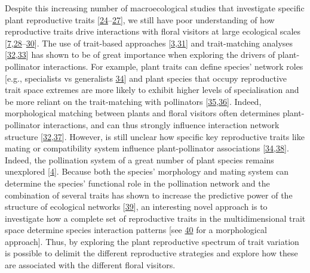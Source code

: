 \documentclass[
  12pt,
  a4paper,
]{article}
\begin{document}
Despite this increasing number of macroecological studies that investigate specific plant reproductive traits {[}\protect\hyperlink{ref-moeller2017}{24}--\protect\hyperlink{ref-grossenbacher2017}{27}{]}, we still have poor understanding of how reproductive traits drive interactions with floral visitors at large ecological scales {[}\protect\hyperlink{ref-salguero2016}{7},\protect\hyperlink{ref-sargent2008}{28}--\protect\hyperlink{ref-ruger2018}{30}{]}. The use of trait-based approaches {[}\protect\hyperlink{ref-fenster2004}{3},\protect\hyperlink{ref-rosas2014}{31}{]} and trait-matching analyses {[}\protect\hyperlink{ref-stang2009}{32},\protect\hyperlink{ref-bartomeus2016}{33}{]} has shown to be of great importance when exploring the drivers of plant-pollinator interactions. For example, plant traits can define species' network roles {[}e.g., specialists vs generalists \protect\hyperlink{ref-tur2013}{34}{]} and plant species that occupy reproductive trait space extremes are more likely to exhibit higher levels of specialisation and be more reliant on the trait-matching with pollinators {[}\protect\hyperlink{ref-junker2013}{35},\protect\hyperlink{ref-coux2016}{36}{]}. Indeed, morphological matching between plants and floral visitors often determines plant-pollinator interactions, and can thus strongly influence interaction network structure {[}\protect\hyperlink{ref-stang2009}{32},\protect\hyperlink{ref-ibanez2012}{37}{]}. However, is still unclear how specific key reproductive traits like mating or compatibility system influence plant-pollinator associations {[}\protect\hyperlink{ref-tur2013}{34},\protect\hyperlink{ref-devaux2014}{38}{]}. Indeed, the pollination system of a great number of plant species remains unexplored {[}\protect\hyperlink{ref-dellinger2020}{4}{]}. Because both the species' morphology and mating system can determine the species' functional role in the pollination network and the combination of several traits has shown to increase the predictive power of the structure of ecological networks {[}\protect\hyperlink{ref-eklof2013}{39}{]}, an interesting novel approach is to investigate how a complete set of reproductive traits in the multidimensional trait space determine species interaction patterns {[}see \protect\hyperlink{ref-dehling2016}{40} for a morphological approach{]}. Thus, by exploring the plant reproductive spectrum of trait variation is possible to delimit the different reproductive strategies and explore how these are associated with the different floral visitors.
\end{document}
